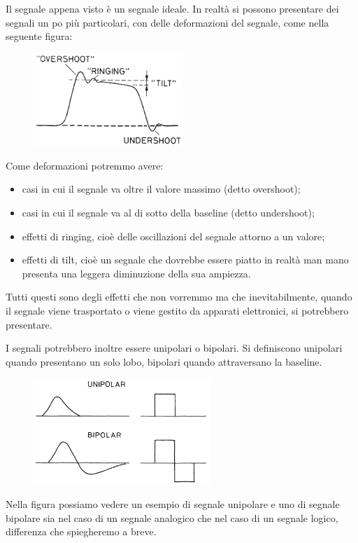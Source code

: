 Il segnale appena visto è un segnale ideale. In realtà si possono presentare dei segnali un po più particolari, con delle deformazioni del segnale, come nella seguente figura:
\begin{figure}[H]
   \centering
   \includegraphics[width=0.5\textwidth]{immagini/terminologia_segnali_2.png}
\end{figure}
Come deformazioni potremmo avere:
\begin{itemize}[leftmargin=0.5cm]
   \item casi in cui il segnale va oltre il valore massimo (detto overshoot);
   \item casi in cui il segnale va al di sotto della baseline (detto undershoot);
   \item effetti di ringing, cioè delle oscillazioni del segnale attorno a un valore;
   \item effetti di tilt, cioè un segnale che dovrebbe essere piatto in realtà man mano presenta una leggera diminuzione della sua ampiezza.
\end{itemize}
Tutti questi sono degli effetti che non vorremmo ma che inevitabilmente, quando il segnale viene trasportato o viene gestito da apparati elettronici, si potrebbero presentare.

\vspace{0.2cm}I segnali potrebbero inoltre essere unipolari o bipolari. Si definiscono unipolari quando presentano un solo lobo, bipolari quando attraversano la baseline.
\begin{figure}[H]
   \centering
   \includegraphics[width=0.6\textwidth]{immagini/segnali_unipolari_e_bipolari.png}
\end{figure}
Nella figura possiamo vedere un esempio di segnale unipolare e uno di segnale bipolare sia nel caso di un segnale analogico che nel caso di un segnale logico, differenza che spiegheremo a breve.

